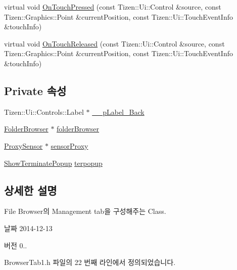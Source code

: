 \begin{DoxyCompactItemize}
\item 
virtual void \hyperlink{class_browser_tab1_af18debc3d96a67c757408b69efff9d2f}{On\+Touch\+Pressed} (const Tizen\+::\+Ui\+::\+Control \&source, const Tizen\+::\+Graphics\+::\+Point \&current\+Position, const Tizen\+::\+Ui\+::\+Touch\+Event\+Info \&touch\+Info)
\item 
virtual void \hyperlink{class_browser_tab1_a958c88e3bc8de62132379fd12b9b1f97}{On\+Touch\+Released} (const Tizen\+::\+Ui\+::\+Control \&source, const Tizen\+::\+Graphics\+::\+Point \&current\+Position, const Tizen\+::\+Ui\+::\+Touch\+Event\+Info \&touch\+Info)
\end{DoxyCompactItemize}
\subsection*{Private 속성}
\begin{DoxyCompactItemize}
\item 
Tizen\+::\+Ui\+::\+Controls\+::\+Label $\ast$ \hyperlink{class_browser_tab1_ad072e2bcaa2a03d684ddfddd0d8dea77}{\+\_\+\+\_\+p\+Label\+\_\+\+Back}
\item 
\hyperlink{class_folder_browser}{Folder\+Browser} $\ast$ \hyperlink{class_browser_tab1_a2a514b5068c1222055a103c67abeeb2a}{folder\+Browser}
\item 
\hyperlink{class_proxy_sensor}{Proxy\+Sensor} $\ast$ \hyperlink{class_browser_tab1_a7dc2f8e362bbc5c88cedb59e0b38cbea}{sensor\+Proxy}
\item 
\hyperlink{class_show_terminate_popup}{Show\+Terminate\+Popup} \hyperlink{class_browser_tab1_a69eaa59d7c5277fe9819b3b7fa7bbea4}{terpopup}
\end{DoxyCompactItemize}


\subsection{상세한 설명}
File Browser의 Management tab을 구성해주는 Class. 

\begin{DoxyDate}{날짜}
2014-\/12-\/13 
\end{DoxyDate}
\begin{DoxyVersion}{버전}
0.. 
\end{DoxyVersion}


Browser\+Tab1.\+h 파일의 22 번째 라인에서 정의되었습니다.



